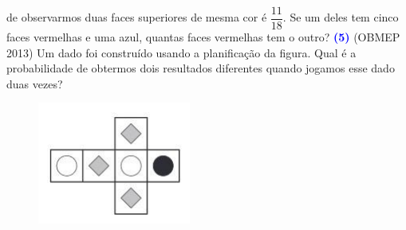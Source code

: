 \documentclass[12pt, a4paper]{article}
\begin{document}
de observarmos duas faces superiores de mesma cor é $\dfrac{11}{18}.$ Se um deles tem cinco faces vermelhas e uma azul, quantas faces vermelhas tem o outro?
\newline\newline
\textcolor{blue}{\bf(5)} (OBMEP 2013) Um dado foi construído usando a planificação da figura. Qual é a probabilidade de
obtermos dois resultados diferentes quando jogamos esse dado duas vezes?
\begin{figure}
    \centering
    \includegraphics{Figuras/q5c2e2.png}
\end{figure}
\end{document}
